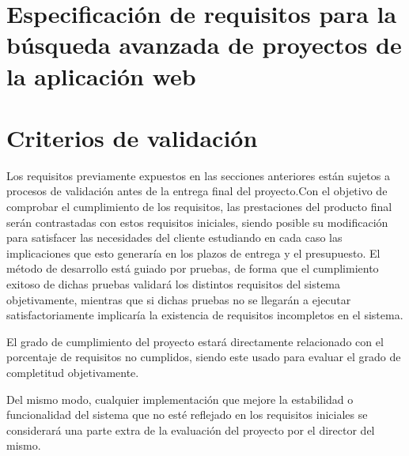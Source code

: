 \section{Especificación de requisitos para la búsqueda avanzada de proyectos de la aplicación web}

\section{Criterios de validación}

Los requisitos previamente expuestos en las secciones anteriores están sujetos a procesos de validación antes de la entrega final del proyecto.Con el objetivo de comprobar el cumplimiento de los requisitos, las prestaciones del producto final serán contrastadas con estos requisitos iniciales, siendo posible su modificación para satisfacer las necesidades del cliente estudiando en cada caso las implicaciones que esto generaría en los plazos de entrega y el presupuesto. El método de desarrollo está guiado por pruebas, de forma que el cumplimiento exitoso de dichas pruebas validará los distintos requisitos del sistema objetivamente, mientras que si dichas pruebas no se llegarán a ejecutar satisfactoriamente implicaría la existencia de requisitos incompletos en el sistema.

El grado de cumplimiento del proyecto estará directamente relacionado con el porcentaje de requisitos no cumplidos, siendo este usado para evaluar el grado de completitud objetivamente.

Del mismo modo, cualquier implementación que mejore la estabilidad o funcionalidad del sistema que no esté reflejado en los requisitos iniciales se considerará una parte extra de la evaluación del proyecto por el director del mismo.